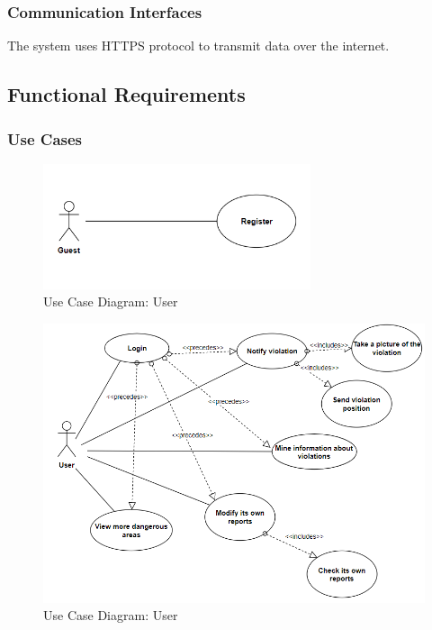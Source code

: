 \subsubsection{Communication Interfaces}
The system uses HTTPS protocol to transmit data over the internet.
\subsection{Functional Requirements}


\subsubsection{Use Cases}


 \begin{figure}[H]
 \centering
        \includegraphics[width=0.7\textwidth]{Images/UCD_guest.PNG}
        \caption{Use Case Diagram: User}
    \end{figure}


 \begin{figure}[H]
        \includegraphics[width=1.1\textwidth,left]{Images/UCD_user.png}
        \caption{Use Case Diagram: User}
    \end{figure}
    
